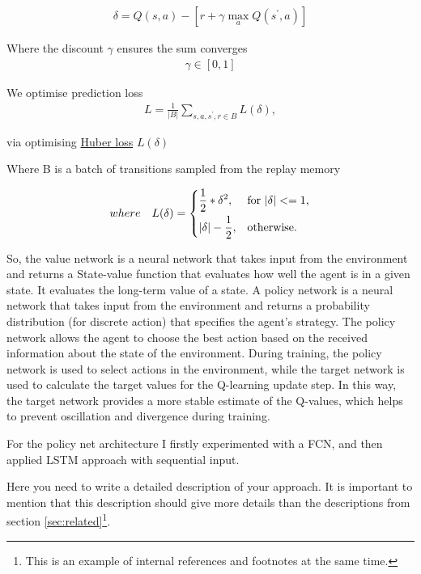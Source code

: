 \documentclass{article}
\begin{document}
\begin{align}
\delta = Q(s, a) - [r + \gamma \max_a{Q(s^{'}, a)}] \nonumber
\end{align}

Where the discount $\gamma$  ensures the sum converges
\begin{align}
\gamma \in[0, 1] \nonumber
\end{align}

We optimise prediction loss
\begin{align}
L = \frac{1}{\left|B\right|} \sum_{s,a,s^{'},r\in B}{L(\delta)},
\end{align}

via optimising \href{https://en.wikipedia.org/wiki/Huber_loss}{Huber loss} $L(\delta)$

Where B is a batch of transitions sampled from the replay memory

\begin{align}
where \quad L(\delta) = \begin{dcases*}
    \frac{1}{2}*\delta^2, & for $ |\delta| <= 1 $,\\
    |\delta|-\frac{1}{2}, & otherwise. 
    \end{dcases*} \nonumber 
\end{align}

So, the value network is a neural network that takes input from the environment and returns a State-value function that evaluates how well the agent is in a given state. It evaluates the long-term value of a state.
A policy network is a neural network that takes input from the environment and returns a probability distribution (for discrete action) that specifies the agent's strategy. The policy network allows the agent to choose the best action based on the received information about the state of the environment.
During training, the policy network is used to select actions in the environment, while the target network is used to calculate the target values for the Q-learning update step. In this way, the target network provides a more stable estimate of the Q-values, which helps to prevent oscillation and divergence during training.

For the policy net architecture I firstly experimented with a FCN, and then applied LSTM approach with sequential input.





Here you need to write a detailed description of your approach. It is important to mention that this description should give more details than the descriptions from section \ref{sec:related}\footnote{This is an example of internal references and footnotes at the same time.}. 
\end{document}
